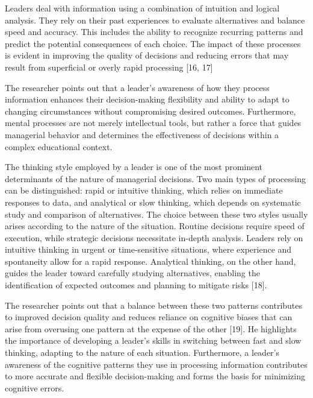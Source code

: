 \documentclass[10pt]{NSP1}
\begin{document}
Leaders deal with information using a combination of intuition and logical analysis. They rely on their past experiences to evaluate alternatives and balance speed and accuracy. This includes the ability to recognize recurring patterns and predict the potential consequences of each choice. The impact of these processes is evident in improving the quality of decisions and reducing errors that may result from superficial or overly rapid processing [16, 17]

The researcher points out that a leader's awareness of how they process information enhances their decision-making flexibility and ability to adapt to changing circumstances without compromising desired outcomes. Furthermore, mental processes are not merely intellectual tools, but rather a force that guides managerial behavior and determines the effectiveness of decisions within a complex educational context.

\par\medskip{}\smallskip

The thinking style employed by a leader is one of the most prominent determinants of the nature of managerial decisions. Two main types of processing can be distinguished: rapid or intuitive thinking, which relies on immediate responses to data, and analytical or slow thinking, which depends on systematic study and comparison of alternatives. The choice between these two styles usually arises according to the nature of the situation. Routine decisions require speed of execution, while strategic decisions necessitate in-depth analysis. Leaders rely on intuitive thinking in urgent or time-sensitive situations, where experience and spontaneity allow for a rapid response. Analytical thinking, on the other hand, guides the leader toward carefully studying alternatives, enabling the identification of expected outcomes and planning to mitigate risks [18].

The researcher points out that a balance between these two patterns contributes to improved decision quality and reduces reliance on cognitive biases that can arise from overusing one pattern at the expense of the other [19]. He highlights the importance of developing a leader's skills in switching between fast and slow thinking, adapting to the nature of each situation. Furthermore, a leader's awareness of the cognitive patterns they use in processing information contributes to more accurate and flexible decision-making and forms the basis for minimizing cognitive errors.
\end{document}
